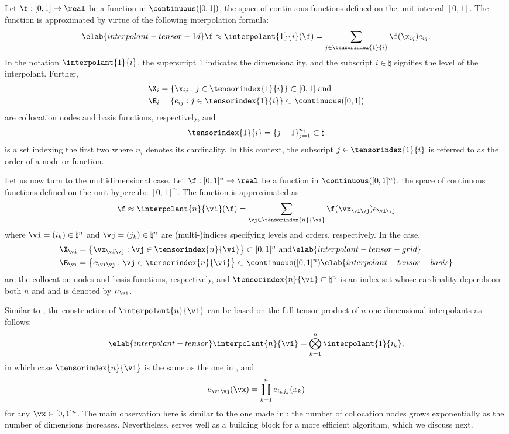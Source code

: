 Let $\f: [0, 1] \to \real$ be a function in $\continuous([0, 1])$, the space of
continuous functions defined on the unit interval $[0, 1]$. The function is
approximated by virtue of the following interpolation formula:
\begin{equation} \elab{interpolant-tensor-1d}
  \f \approx \interpolant{1}{i}(\f) = \sum_{j \in \tensorindex{1}{i}} \f(\x_{ij}) e_{ij}.
\end{equation}
In the notation $\interpolant{1}{i}$, the superscript 1 indicates the
dimensionality, and the subscript $i \in \natural$ signifies the level of the
interpolant. Further,
\begin{align*}
  & \X_i = \{ \x_{ij}: j \in \tensorindex{1}{i} \} \subset [0, 1] \text{ and} \\
  & \E_i = \{ e_{ij}: j \in \tensorindex{1}{i} \} \subset \continuous([0, 1])
\end{align*}
are collocation nodes and basis functions, respectively, and
\[
  \tensorindex{1}{i} = \{ j - 1 \}_{j = 1}^{n_i} \subset \natural
\]
is a set indexing the first two where $n_i$ denotes its cardinality. In this
context, the subscript $j \in \tensorindex{1}{i}$ is referred to as the order of
a node or function.

Let us now turn to the multidimensional case. Let $\f: [0, 1]^n \to \real$ be a
function in $\continuous([0, 1]^n)$, the space of continuous functions defined
on the unit hypercube $[0, 1]^n$. The function is approximated as
\[
  \f \approx \interpolant{n}{\vi}(\f)
  = \sum_{\vj \in \tensorindex{n}{\vi}} \f(\vx_{\vi \vj}) e_{\vi \vj}
\]
where $\vi = (i_k) \in \natural^n$ and $\vj = (j_k) \in \natural^n$ are
(multi-)indices specifying levels and orders, respectively. In the case,
\begin{align}
  & \X_{\vi} = \left\{ \vx_{\vi \vj}: \vj \in \tensorindex{n}{\vi} \right\} \subset [0, 1]^n \text{ and} \elab{interpolant-tensor-grid} \\
  & \E_{\vi} = \left\{ e_{\vi \vj}: \vj \in \tensorindex{n}{\vi} \right\} \subset \continuous([0, 1]^n) \elab{interpolant-tensor-basis}
\end{align}
are the collocation nodes and basis functions, respectively, and
$\tensorindex{n}{\vi} \subset \natural^n$ is an index set whose cardinality
depends on both $n$ and \vi and is denoted by $n_{\vi}$.

Similar to , the construction of $\interpolant{n}{\vi}$
can be based on the full tensor product of $n$ one-dimensional interpolants as
follows:
\begin{equation} \elab{interpolant-tensor}
  \interpolant{n}{\vi} = \bigotimes_{k = 1}^n \interpolant{1}{i_k},
\end{equation}
in which case $\tensorindex{n}{\vi}$ is the same as the one in
, and
\[
  e_{\vi \vj}(\vx) = \prod_{k = 1}^n e_{i_k j_k}(x_k)
\]
for any $\vx \in [0, 1]^n$. The main observation here is similar to the one made
in : the number of collocation nodes grows
exponentially as the number of dimensions increases. Nevertheless,
 serves well as a building block for a more efficient
algorithm, which we discuss next.

